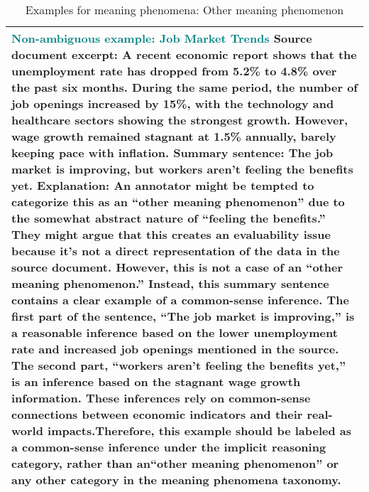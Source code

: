 \begin{table*}
\begin{tabular}{@{}p{14cm}@{}}
    \\ 
\midrule
\textbf{\textcolor{teal}{Non-ambiguous example: Job Market Trends}}
\newline
\textbf{Source document excerpt:}
A recent economic report shows that the unemployment rate has dropped from 5.2\% to 4.8\% over the past six months. During the same period, the number of job openings increased by 15\%, with the technology and healthcare sectors showing the strongest growth. However, wage growth remained stagnant at 1.5\% annually, barely keeping pace with inflation.
\newline
\textbf{Summary sentence:}
The job market is improving, but workers aren’t feeling the benefits yet.
\newline
\textbf{Explanation:}
An annotator might be tempted to categorize this as an “other meaning phenomenon” due to the somewhat abstract nature of “feeling the benefits.” They might argue that this creates an evaluability issue because it’s not a direct representation of the data in the source document. However, this is not a case of an “other meaning phenomenon.” Instead, this summary sentence contains a clear example of a common-sense inference. The first part of the sentence, “The job market is improving,” is a reasonable inference based on the lower unemployment rate and increased job openings mentioned in the source. The second part, “workers aren’t feeling the benefits yet,” is an inference based on the stagnant wage growth information. These inferences rely on common-sense connections between economic indicators and their real-world impacts.Therefore, this example should be labeled as a common-sense inference under the implicit reasoning category, rather than an“other meaning phenomenon” or any other category in the meaning phenomena taxonomy.
    \\ 
 \bottomrule
\end{tabular}
\caption{Examples for meaning phenomena: Other meaning phenomenon}
\label{tab:other_meaning_example}
\end{table*}